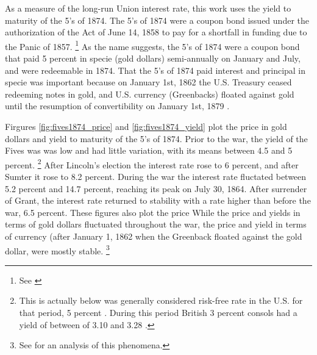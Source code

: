 As a measure of the long-run Union interest rate, this work uses the yield to maturity of the 5's of 1874.
The 5's of 1874 were a coupon bond issued under the authorization of the Act of June 14, 1858 to pay for a shortfall in funding due to the Panic of 1857.%
\footnote{See \textcites[p. 76]{Bayley1882}[78--79]{DeKnight1900}[42-43]{Treasury1863}[300-301, 305]{HomerSylla2005}}
As the name suggests, the 5's of 1874 were a coupon bond that paid 5 percent in specie (gold dollars) semi-annually on January and July, and were redeemable in 1874.
That the 5's of 1874 paid interest and principal in specie was important because on January 1st, 1862 the U.S. Treasury ceased redeeming notes in gold, and U.S. currency (Greenbacks) floated against gold until the resumption of convertibility on January 1st, 1879 \parencites{Dewey1918}{WillardGuinnaneEtAl1996}.

Firgures \ref{fig:fives1874_price} and \ref{fig:fives1874_yield} plot the price in gold dollars and yield to maturity of the 5's of 1874.
Prior to the war, the yield of the Fives was was low and had little variation, with its means between 4.5 and 5 percent.%
\footnote{
  This is actually below was generally considered risk-free rate in the U.S. for that period, 5 percent \parencite[][calls it the ``natural rate'']{Elder1863}.
  During this period British 3 percent consols had a yield of between of 3.10 and 3.28 \parencite[193]{HomerSylla2005}.
}
After Lincoln's election the interest rate rose to 6 percent, and after Sumter it rose to 8.2 percent.
During the war the interest rate fluctated between 5.2 percent and 14.7 percent, reaching its peak on July 30, 1864.
After surrender of Grant, the interest rate returned to stability with a rate higher than before the war, 6.5 percent.
These figures also plot the price
While the price and yields in terms of gold dollars fluctuated throughout the war, the price and yield in terms of currency (after January 1, 1862 when the Greenback floated against the gold dollar, were mostly stable.%
\footnote{See \textcite{Roll1972} for an analysis of this phenomena.}

